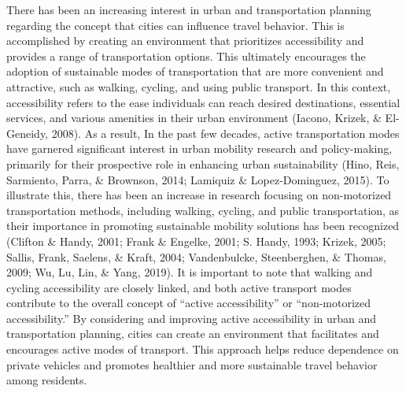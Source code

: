 \documentclass[
11pt, %
oneside, %
english, %
singlespacing, %
]{macthesis} %
\begin{document}
There has been an increasing interest in urban and transportation planning regarding the concept that cities can influence travel behavior. This is accomplished by creating an environment that prioritizes accessibility and provides a range of transportation options. This ultimately encourages the adoption of sustainable modes of transportation that are more convenient and attractive, such as walking, cycling, and using public transport. In this context, accessibility refers to the ease individuals can reach desired destinations, essential services, and various amenities in their urban environment (Iacono, Krizek, \& El-Geneidy, 2008). As a result, In the past few decades, active transportation modes have garnered significant interest in urban mobility research and policy-making, primarily for their prospective role in enhancing urban sustainability (Hino, Reis, Sarmiento, Parra, \& Brownson, 2014; Lamiquiz \& Lopez-Dominguez, 2015). To illustrate this, there has been an increase in research focusing on non-motorized transportation methods, including walking, cycling, and public transportation, as their importance in promoting sustainable mobility solutions has been recognized (Clifton \& Handy, 2001; Frank \& Engelke, 2001; S. Handy, 1993; Krizek, 2005; Sallis, Frank, Saelens, \& Kraft, 2004; Vandenbulcke, Steenberghen, \& Thomas, 2009; Wu, Lu, Lin, \& Yang, 2019). It is important to note that walking and cycling accessibility are closely linked, and both active transport modes contribute to the overall concept of ``active accessibility'' or ``non-motorized accessibility.'' By considering and improving active accessibility in urban and transportation planning, cities can create an environment that facilitates and encourages active modes of transport. This approach helps reduce dependence on private vehicles and promotes healthier and more sustainable travel behavior among residents.
\end{document}
